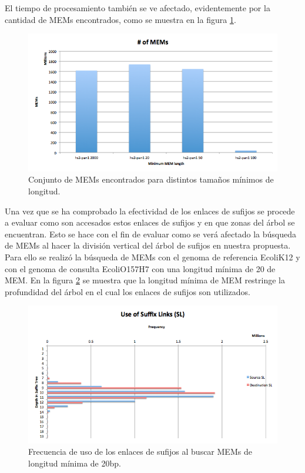 \documentclass[12pt,a4paper]{article}
\begin{document}
El tiempo de procesamiento también se ve afectado, evidentemente por la cantidad de MEMs encontrados, como se muestra en la figura \ref{fig:mems}.\\
\begin{figure}[h]
\begin{center}
\includegraphics[scale=0.4]{mems.png}
\caption{Conjunto de MEMs encontrados para distintos tamaños mínimos de longitud.}
\label{fig:mems}
\end{center}
\end{figure}
\indent
Una vez que se ha comprobado la efectividad de los enlaces de sufijos se procede a evaluar como son accesados estos enlaces de sufijos y en que zonas del árbol se encuentran. Esto se hace con el fin de evaluar como se verá afectado la búsqueda de MEMs al hacer la división vertical del árbol de sufijos en nuestra propuesta.\\
\indent
Para ello se realizó la búsqueda de MEMs con el genoma de referencia EcoliK12 y con el genoma de consulta EcoliO157H7 con una longitud mínima de 20 de MEM. En la figura \ref{fig:use-sl} se muestra que la longitud mínima de MEM restringe la profundidad del árbol en el cual los enlaces de sufijos son utilizados.\\
\begin{figure}[h]
\begin{center}
\includegraphics[scale=0.4]{use-sl.png}
\caption{Frecuencia de uso de los enlaces de sufijos al buscar MEMs de longitud mínima de 20bp.}
\label{fig:use-sl}
\end{center}
\end{figure}
\end{document}
